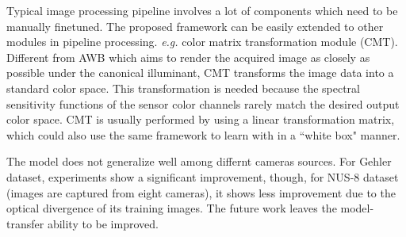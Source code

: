 \documentclass[10pt,twocolumn,letterpaper]{article}
\begin{document}
Typical image processing pipeline involves a lot of components which need to be manually finetuned.
The proposed framework can be easily extended to other modules in pipeline processing.
\textit{e.g.} color matrix transformation module (CMT).
Different from AWB which aims to render the acquired image as closely as possible under the canonical illuminant,
CMT transforms the image data into a standard color space.
This transformation is needed because the spectral sensitivity functions of the sensor color channels
rarely match the desired output color space.
CMT is usually performed by using a linear transformation matrix,
which could also use the same framework to learn with in a ``white box" manner.

The model does not generalize well among differnt cameras sources.
For Gehler dataset, experiments show a significant improvement,
though, for NUS-8 dataset (images are captured from eight cameras),
it shows less improvement due to the optical divergence of its training images.
The future work leaves the model-transfer ability to be improved.

{\small
% 


}
\end{document}

